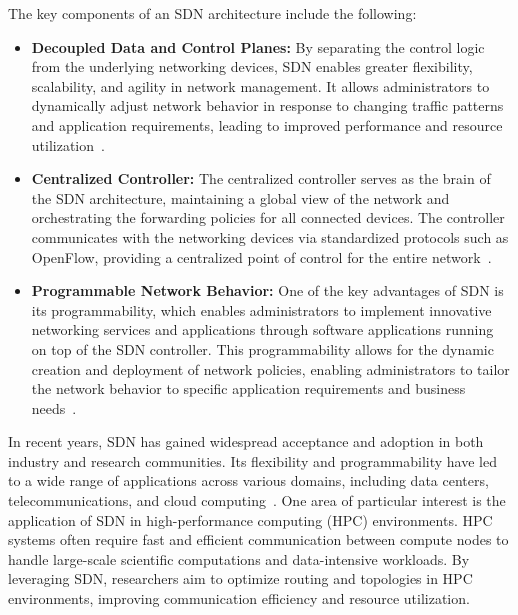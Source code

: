 The key components of an SDN architecture include the following:

\begin{itemize}

\item \textbf{Decoupled Data and Control Planes:} By separating the control logic from the underlying networking devices, SDN enables greater flexibility, scalability, and agility in network management. It allows administrators to dynamically adjust network behavior in response to changing traffic patterns and application requirements, leading to improved performance and resource utilization~\cite{tr2016sdn, kreutz2014software}.

\item \textbf{Centralized Controller:} The centralized controller serves as the brain of the SDN architecture, maintaining a global view of the network and orchestrating the forwarding policies for all connected devices. The controller communicates with the networking devices via standardized protocols such as OpenFlow, providing a centralized point of control for the entire network~\cite{tr2016sdn, kreutz2014software}.

\item \textbf{Programmable Network Behavior:} One of the key advantages of SDN is its programmability, which enables administrators to implement innovative networking services and applications through software applications running on top of the SDN controller. This programmability allows for the dynamic creation and deployment of network policies, enabling administrators to tailor the network behavior to specific application requirements and business needs~\cite{tr2016sdn, kreutz2014software}.

\end{itemize}




In recent years, SDN has gained widespread acceptance and adoption in both industry and research communities. Its flexibility and programmability have led to a wide range of applications across various domains, including data centers, telecommunications, and cloud computing~\cite{alalmaei2020sdn, faizian2017comparative}. 
One area of particular interest is the application of SDN in high-performance computing (HPC) environments. HPC systems often require fast and efficient communication between compute nodes to handle large-scale scientific computations and data-intensive workloads. By leveraging SDN, researchers aim to optimize routing and topologies in HPC environments, improving communication efficiency and resource utilization.

